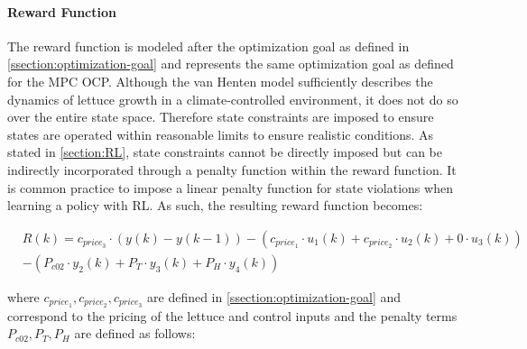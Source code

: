 \paragraph{Reward Function}
\label{paragraph:reward-function}
The reward function is modeled after the optimization goal as defined in \autoref{ssection:optimization-goal} and represents the same optimization goal as defined for the MPC OCP. Although the van Henten model sufficiently describes the dynamics of lettuce growth in a climate-controlled environment, it does not do so over the entire state space. Therefore state constraints are imposed to ensure states are operated within reasonable limits to ensure realistic conditions. As stated in \autoref{section:RL}, state constraints cannot be directly imposed but can be indirectly incorporated through a penalty function within the reward function. It is common practice to impose a linear penalty function for state violations when learning a policy with RL. As such, the resulting reward function becomes:

\begin{equation}\label{eq:reward_fn}
    \begin{aligned}
        & R(k)  = c_{price_3} \cdot (y(k)- y(k-1)) - (c_{price_1} \cdot u_1(k) + c_{price_2} \cdot u_2(k) + 0 \cdot u_3(k))  \\ 
        & - (P_{c02} \cdot y_2(k) + P_T \cdot y_3(k) + P_H \cdot y_4(k))
    \end{aligned}
\end{equation}

where $c_{price_1},c_{price_2},c_{price_3}$ are defined in \autoref{ssection:optimization-goal} and correspond to the pricing of the lettuce and control inputs
and the penalty terms $P_{c02},P_T,P_H$ are defined as follows:

